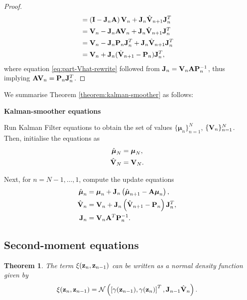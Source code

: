 \documentclass[12pt, oneside]{book}
\numberwithin{equation}{section}
\newcommand{\z}{{\bf z}}
\newcommand{\N}{\mathcal{N}}
\newtheorem{theorem}{Theorem}[section]
\begin{document}
{\begin{proof}
\begin{align}
		&= \left({\bf I} - {\bf J}_n{\bf A}\right){\bf V}_n + {\bf J}_n\hat{\bf V}_{n+1}{\bf J}_n^T\\
		&= {\bf V}_n - {\bf J}_n{\bf A}{\bf V}_n + {\bf J}_n\hat{\bf V}_{n+1}{\bf J}_n^T\\
		&= {\bf V}_n - {\bf J}_n{\bf P}_n{\bf J}_n^T + {\bf J}_n\hat{\bf V}_{n+1}{\bf J}_n^T \label{eq:part-Vhat-rewrite} \\
		&= {\bf V}_n + {\bf J}_n(\hat{\bf V}_{n+1} - {\bf P}_n){\bf J}_n^T,
	\end{align}
	where equation \eqref{eq:part-Vhat-rewrite} followed from ${\bf J}_n = {\bf V}_n{\bf A}{\bf P}_n^{-1}$, thus implying ${\bf AV}_n = {\bf P}_n{\bf J}_n^T$.
\end{proof}

We summarise Theorem \ref{theorem:kalman-smoother} as follows:
\begin{tcolorbox}
\textbf{Kalman-smoother equations}

	Run Kalman Filter equations to obtain the set of values $\{\boldsymbol\mu_n\}_{n=1}^N$, $\{{\bf V}_n\}_{n=1}^N$. Then, initialise the equations as
	\begin{align}
		\hat{\boldsymbol{\mu}}_N &= \boldsymbol{\mu}_N,\\
		\hat{{\bf V}}_N &= {\bf V}_N.
	\end{align}

	Next, for $n=N-1, \ldots, 1$, compute the update equations
	\begin{align}
		\hat{\boldsymbol{\mu}}_n &= \boldsymbol{\mu}_n + {\bf J}_n\left(\hat{\boldsymbol \mu}_{n+1} - {\bf A}\boldsymbol\mu_n\right),\\
		\hat{\bf V}_n &= {\bf V}_n + {\bf J}_n\left(\hat{\bf V}_{n+1} - {\bf P}_n\right){\bf J}_n^T,\\
		{\bf J}_n &= {\bf V}_n{\bf A}^T{\bf P}_n^{-1}.
	\end{align}
\end{tcolorbox}

\subsection{Second-moment equations}
\begin{theorem}
	The term $\xi(\z_n, \z_{n-1})$ can be written as a normal density function given by
	\begin{equation}
		\xi(\z_n, \z_{n-1}) = \N\left(\left[\gamma(\z_{n-1}), \gamma(\z_{n})\right]^T, {\bf J}_{n-1}\hat{\bf V}_{n}\right).
	\end{equation}
\end{theorem}

}
\end{document}
